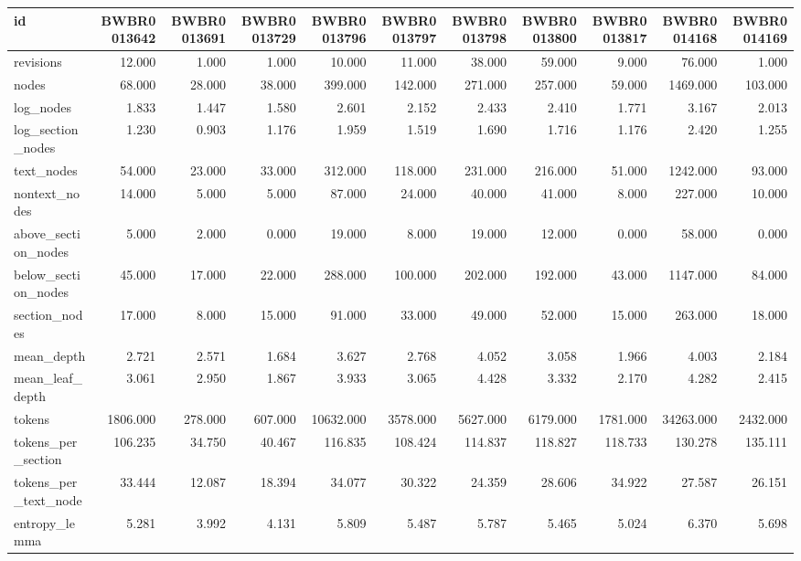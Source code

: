 \begin{tabular}{lrrrrrrrrrr}
\toprule
id & BWBR0013642 & BWBR0013691 & BWBR0013729 & BWBR0013796 & BWBR0013797 & BWBR0013798 & BWBR0013800 & BWBR0013817 & BWBR0014168 & BWBR0014169 \\
\midrule
revisions & 12.000 & 1.000 & 1.000 & 10.000 & 11.000 & 38.000 & 59.000 & 9.000 & 76.000 & 1.000 \\
\cline{1-11}
nodes & 68.000 & 28.000 & 38.000 & 399.000 & 142.000 & 271.000 & 257.000 & 59.000 & 1469.000 & 103.000 \\
\cline{1-11}
log\_nodes & 1.833 & 1.447 & 1.580 & 2.601 & 2.152 & 2.433 & 2.410 & 1.771 & 3.167 & 2.013 \\
\cline{1-11}
log\_section\_nodes & 1.230 & 0.903 & 1.176 & 1.959 & 1.519 & 1.690 & 1.716 & 1.176 & 2.420 & 1.255 \\
\cline{1-11}
text\_nodes & 54.000 & 23.000 & 33.000 & 312.000 & 118.000 & 231.000 & 216.000 & 51.000 & 1242.000 & 93.000 \\
\cline{1-11}
nontext\_nodes & 14.000 & 5.000 & 5.000 & 87.000 & 24.000 & 40.000 & 41.000 & 8.000 & 227.000 & 10.000 \\
\cline{1-11}
above\_section\_nodes & 5.000 & 2.000 & 0.000 & 19.000 & 8.000 & 19.000 & 12.000 & 0.000 & 58.000 & 0.000 \\
\cline{1-11}
below\_section\_nodes & 45.000 & 17.000 & 22.000 & 288.000 & 100.000 & 202.000 & 192.000 & 43.000 & 1147.000 & 84.000 \\
\cline{1-11}
section\_nodes & 17.000 & 8.000 & 15.000 & 91.000 & 33.000 & 49.000 & 52.000 & 15.000 & 263.000 & 18.000 \\
\cline{1-11}
mean\_depth & 2.721 & 2.571 & 1.684 & 3.627 & 2.768 & 4.052 & 3.058 & 1.966 & 4.003 & 2.184 \\
\cline{1-11}
mean\_leaf\_depth & 3.061 & 2.950 & 1.867 & 3.933 & 3.065 & 4.428 & 3.332 & 2.170 & 4.282 & 2.415 \\
\cline{1-11}
tokens & 1806.000 & 278.000 & 607.000 & 10632.000 & 3578.000 & 5627.000 & 6179.000 & 1781.000 & 34263.000 & 2432.000 \\
\cline{1-11}
tokens\_per\_section & 106.235 & 34.750 & 40.467 & 116.835 & 108.424 & 114.837 & 118.827 & 118.733 & 130.278 & 135.111 \\
\cline{1-11}
tokens\_per\_text\_node & 33.444 & 12.087 & 18.394 & 34.077 & 30.322 & 24.359 & 28.606 & 34.922 & 27.587 & 26.151 \\
\cline{1-11}
entropy\_lemma & 5.281 & 3.992 & 4.131 & 5.809 & 5.487 & 5.787 & 5.465 & 5.024 & 6.370 & 5.698 \\

\end{tabular}
